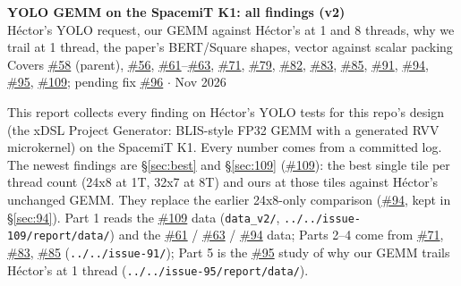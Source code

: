 \documentclass[10pt,a4paper]{article}
\newcommand{\iss}[1]{\href{https://github.com/JieGH/RVV_code_gen_via_MLIR_xDSL/issues/#1}{\##1}}
\begin{document}
\begin{center}
{\Large\bfseries YOLO GEMM on the SpacemiT K1: all findings (v2)}\\[4pt]
H\'ector's YOLO request, our GEMM against H\'ector's at 1 and 8 threads, why we trail at 1 thread, the paper's BERT/Square shapes, vector against scalar packing\\[2pt]
Covers \iss{58} (parent), \iss{56}, \iss{61}--\iss{63}, \iss{71}, \iss{79}, \iss{82}, \iss{83}, \iss{85}, \iss{91}, \iss{94}, \iss{95}, \iss{109}; pending fix \iss{96} \quad$\cdot$ Nov 2026
\end{center}

\noindent This report collects every finding on H\'ector's YOLO tests for this repo's design (the xDSL Project Generator:
BLIS-style FP32 GEMM with a generated RVV microkernel) on the SpacemiT K1. Every number comes from a committed log. The newest findings are \S\ref{sec:best} and \S\ref{sec:109} (\iss{109}): the best single tile per thread count (24x8 at 1T, 32x7 at 8T) and ours at those tiles against H\'ector's unchanged GEMM. They replace the earlier 24x8-only comparison (\iss{94}, kept in \S\ref{sec:94}). Part 1 reads the \iss{109} data (\texttt{data\_v2/}, \texttt{../../issue-109/report/data/}) and the \iss{61} / \iss{63} / \iss{94} data; Parts 2--4 come from \iss{71}, \iss{83}, \iss{85} (\texttt{../../issue-91/}); Part 5 is the \iss{95} study of why our GEMM trails H\'ector's at 1 thread (\texttt{../../issue-95/report/data/}).







\clearpage

\end{document}

